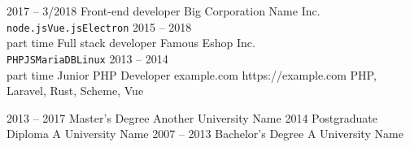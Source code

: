 \begin{minipage}[t]{0.5\textwidth}
    \vspace{-\baselineskip}


    \begin{entrylist}
        \entry
            {2017 -- 3/2018}
            {Front-end developer}
            {Big Corporation Name Inc.}
            {}
            {}
            {\lorem \lorem \lorem\\ \texttt{node.js}\slashsep\texttt{Vue.js}\slashsep\texttt{Electron}}
        \entry
            {2015 -- 2018\\\footnotesize{part time}}
            {Full stack developer}
            {Famous Eshop Inc.}
            {}
            {}
            {\lorem\lorem\\ \texttt{PHP}\slashsep\texttt{JS}\slashsep\texttt{MariaDB}\slashsep\texttt{Linux}}
        \entry
            {2013 -- 2014\\{\footnotesize part time }}
            {Junior PHP Developer}
            {example.com}
            {https://example.com}
            {PHP, Laravel, Rust, Scheme, Vue}
            {\entryitems{\lorem, \lorem}}
    \end{entrylist}


    \begin{entrylist}
        \entry
            {2013 -- 2017}
            {Master's Degree}
            {Another University Name}
            {}
            {}
            {\lorem\lorem\lorem}
        \entry
            {2014}
            {Postgraduate Diploma}
            {A University Name}
            {}
            {}
            {\lorem\lorem}
        \entry
            {2007 -- 2013}
            {Bachelor's Degree}
            {A University Name}
            {}
            {}
            {\lorem\lorem}
    \end{entrylist}
\end{minipage}
%
\hfill
\begin{minipage}[t]{0.44\textwidth}
    \vspace{-\baselineskip}

    

    \begin{barchart}{5.5}
    \end{barchart}

\end{minipage}


